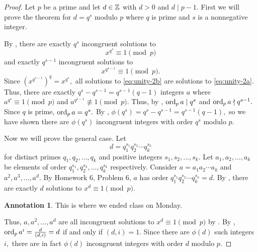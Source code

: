 \documentclass[letterpaper, 11 pt]{ximera}
\theoremstyle{definition}
\newtheorem*{annotation}{Annotation}
\begin{document}
\begin{proof}
    Let $p$ be a prime and let $d\in\mathbb Z$ with $d>0$ and $d\mid p-1.$ First we will prove the theorem for $d=q^s$ modulo $p$ where $q$ is prime and $s$ is a nonnegative integer.

    By , there are exactly $q^s$ incongruent solutions to 
    \begin{equation}\label{eq:unity-2a}
        x^{q^s}\equiv 1\pmod{p}
    \end{equation} and exactly $q^{s-1}$ incongruent solutions to 
    \begin{equation}\label{eq:unity-2b}
        x^{q^{s-1}}\equiv 1\pmod{p}.
    \end{equation}
    Since $(x^{q^{s-1}})^q=x^{q^s},$ all solutions to \eqref{eq:unity-2b} are solutions to \eqref{eq:unity-2a}. 
    Thus, there are exactly $q^s-q^{s-1}=q^{s-1}(q-1)$ integers $a$ where $a^{q^s}\equiv 1\pmod{p}$ and $a^{q^{s-1}}\not\equiv 1\pmod{p}.$ Thus, by , $\operatorname{ord}_p a \mid q^s$ and $\operatorname{ord}_p a\nmid q^{s-1}.$ Since $q$ is prime, $\operatorname{ord}_p a =q^s.$ By , $\phi(q^s)=q^s-q^{s-1}=q^{s-1}(q-1),$ so we have shown there are $\phi(q^s)$ incongruent integers with order $q^s$ modulo $p$.

    Now we will prove the general case. Let 
    \[d=q_1^{s_1}q_2^{s_2}\cdots q_k^{s_k}\]
    for distinct primes $q_1,q_2,\dots,q_k$ and positive integers $s_1,s_2,\dots,s_k.$ Let $a_1,a_2,\dots,a_k$ be elements of order $q_1^{s_1},q_2^{s_2},\dots, q_k^{s_k}$ respectively.
    Consider $a=a_1a_2\cdots a_k$ and $a^2, a^3,\dots,a^d$. By Homework 6, Problem 6, $a$ has order $q_1^{s_1}q_2^{s_2}\cdots q_k^{s_k}=d.$ 
    By , there are exactly $d$ solutions to $x^d\equiv 1\pmod{p}$. \begin{annotation}
        This is where we ended class on Monday.
    \end{annotation}
    Thus, $a, a^2,\dots,a^d$ are all incongruent solutions to $x^d\equiv 1\pmod{p}$ by . 
    By ,
    $\operatorname{ord}_p a^i=\frac{d}{(d,i)}=d$ if and only if $(d,i)=1.$ Since there are $\phi(d)$ such integers $i,$ there are in fact $\phi(d)$ incongruent integers with order $d$ modulo $p.$
\end{proof}
\end{document}
